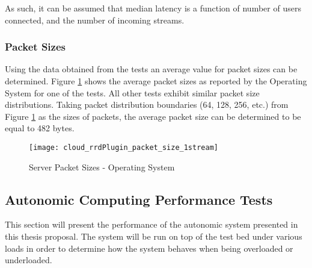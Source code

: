As such, it can be assumed that median latency is a function of number of users connected, and the number of incoming streams.

\subsubsection{Packet Sizes}

Using the data obtained from the tests an average value for packet sizes can be determined. Figure \ref{fig:1serv1streampacketsizes} shows the average packet sizes as reported by the Operating System for one of the tests. All other tests exhibit similar packet size distributions. Taking packet distribution boundaries (64, 128, 256, etc.) from Figure \ref{fig:1serv1streampacketsizes} as the sizes of packets, the average packet size can be determined to be equal to 482 bytes.

\begin{figure}
	\centering
		\texttt{[image: cloud\_rrdPlugin\_packet\_size\_1stream]}
	\caption{Server Packet Sizes - Operating System}
	\label{fig:1serv1streampacketsizes}
\end{figure}

\subsection{Autonomic Computing Performance Tests}

This section will present the performance of the autonomic system presented in this thesis proposal. The system will be run on top of the test bed under various loads in order to determine how the system behaves when being overloaded or underloaded.